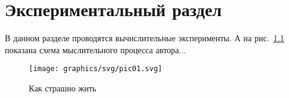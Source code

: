 \chapter{Экспериментальный раздел}
\label{cha:research}

В данном разделе проводятся вычислительные эксперименты.
А на рис.~\ref{fig:spire01} показана схема мыслительного процесса автора...

\begin{figure}
  \centering
  \texttt{[image: graphics/svg/pic01.svg]}
  \caption{Как страшно жить}
  \label{fig:spire01}
\end{figure}



